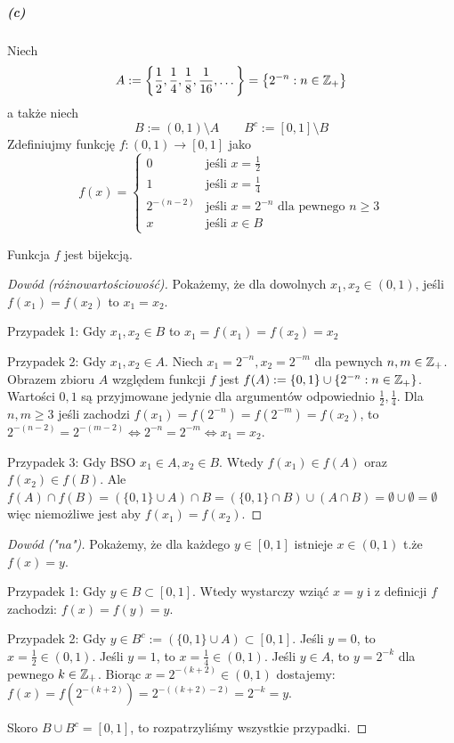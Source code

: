 \subparagraph{(c)}

Niech
$$A := \left\{\frac{1}{2}, \frac{1}{4}, \frac{1}{8}, \frac{1}{16}, \dots \right\}
= \left\{ 2^{-n} : n \in \mathbb{Z}_+ \right\}
$$
a także niech
$$B := (0,1) \setminus A \quad \quad B^c := [0,1] \setminus B$$
Zdefiniujmy funkcję $f: (0, 1) \to [0, 1]$ jako
$$
f(x) = \begin{cases}
  0 & \text{jeśli } x = \frac{1}{2} \\
  1 & \text{jeśli } x = \frac{1}{4} \\
  2^{-(n-2)} & \text{jeśli } x = 2^{-n} \text{ dla pewnego } n \geq 3 \\
  x & \text{jeśli } x \in B
\end{cases}
$$

\begin{lemat}
Funkcja $f$ jest bijekcją.
\end{lemat}

\begin{proof}[Dowód (różnowartościowość)]
\sloppy
Pokażemy, że dla dowolnych $x_1, x_2 \in (0, 1)$,
jeśli $f(x_1) = f(x_2)$ to $x_1 = x_2$.

Przypadek 1: Gdy $x_1, x_2 \in B$ to
$x_1 = f(x_1) = f(x_2) = x_2$

Przypadek 2: Gdy $x_1, x_2 \in A$.
Niech $x_1 = 2^{-n}, x_2 = 2^{-m}$ dla pewnych $n, m \in \mathbb{Z}_+$.
Obrazem zbioru $A$ względem funkcji $f$ jest
$f(A) := \{0, 1\} \cup \left\{ 2^{-n} : n \in \mathbb{Z}_+ \right\}$.
Wartości $0, 1$ są przyjmowane jedynie dla argumentów odpowiednio $\frac{1}{2}, \frac{1}{4}$.
Dla $n,m \geq 3$ jeśli zachodzi $f(x_1) = f(2^{-n}) = f(2^{-m}) = f(x_2)$, to
$2^{-(n-2)} = 2^{-(m-2)} \iff 2^{-n} = 2^{-m} \iff x_1 = x_2$.

Przypadek 3: Gdy BSO $x_1 \in A, x_2 \in B$.
Wtedy $f(x_1) \in f(A)$ oraz $f(x_2) \in f(B)$.
Ale $f(A) \cap f(B) = (\{0,1\} \cup A) \cap B = (\{0,1\} \cap B) \cup (A \cap B)
= \emptyset \cup \emptyset = \emptyset$ więc niemożliwe jest aby $f(x_1) = f(x_2)$.
\end{proof}

\begin{proof}[Dowód ("na")] Pokażemy, że dla każdego $y \in [0, 1]$ istnieje
$x \in (0, 1)$ t.że $f(x) = y$.

Przypadek 1: Gdy $y \in B \subset [0, 1]$. Wtedy wystarczy wziąć $x = y$ i
z definicji $f$ zachodzi: $f(x)=f(y)=y$.

Przypadek 2: Gdy $y \in B^c := (\{0,1\} \cup A) \subset [0, 1]$. Jeśli $y=0$, to
$x=\frac{1}{2} \in (0, 1)$. Jeśli $y=1$, to $x=\frac{1}{4} \in (0,1)$. Jeśli $y \in A$, to $y = 2^{-k}$
dla pewnego $k \in \mathbb{Z}_+$. Biorąc $x=2^{-(k+2)} \in (0, 1)$ dostajemy:
$f(x) = f(2^{-(k+2)}) = 2^{-((k+2)-2)} = 2^{-k} = y$.

Skoro $B \cup B^c = [0, 1]$, to rozpatrzyliśmy wszystkie przypadki.
\end{proof}


